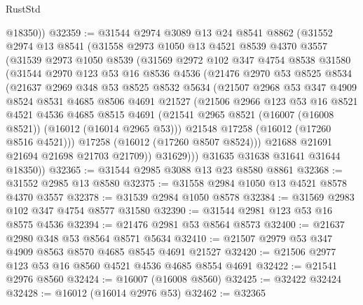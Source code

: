 \begin{lexlean}{RustStd}
\begin{coremodule}
        @18350))
@32359 := @31544
    @2974
    @3089
    @13
    @24
    @8541
    @8862
    (@31552
      @2974
      @13
      @8541
      (@31558
        @2973
        @1050
        @13
        @4521
        @8539
        @4370
        @3557
        (@31539
          @2973
          @1050
          @8539
          (@31569
            @2972
            @102
            @347
            @4754
            @8538
            @31580
            (@31544
              @2970
              @123
              @53
              @16
              @8536
              @4536
              (@21476
                @2970
                @53
                @8525
                @8534
                (@21637
                  @2969
                  @348
                  @53
                  @8525
                  @8532
                  @5634
                  (@21507
                    @2968
                    @53
                    @347
                    @4909
                    @8524
                    @8531
                    @4685
                    @8506
                    @4691
                    @21527
                    (@21506
                      @2966
                      @123
                      @53
                      @16
                      @8521
                      @4521
                      @4536
                      @4685
                      @8515
                      @4691
                      (@21541 @2965 @8521 (@16007 (@16008 @8521)) (@16012 (@16014 @2965 @53)))
                      @21548
                      @17258
                      (@16012 (@17260 @8516 @4521)))
                    @17258
                    (@16012 (@17260 @8507 @8524)))
                  @21688
                  @21691
                  @21694
                  @21698
                  @21703
                  @21709))
              @31629)))
        @31635
        @31638
        @31641
        @31644
        @18350))
@32365 := @31544 @2985 @3088 @13 @23 @8580 @8861
@32368 := @31552 @2985 @13 @8580
@32375 := @31558 @2984 @1050 @13 @4521 @8578 @4370 @3557
@32378 := @31539 @2984 @1050 @8578
@32384 := @31569 @2983 @102 @347 @4754 @8577 @31580
@32390 := @31544 @2981 @123 @53 @16 @8575 @4536
@32394 := @21476 @2981 @53 @8564 @8573
@32400 := @21637 @2980 @348 @53 @8564 @8571 @5634
@32410 := @21507 @2979 @53 @347 @4909 @8563 @8570 @4685 @8545 @4691 @21527
@32420 := @21506 @2977 @123 @53 @16 @8560 @4521 @4536 @4685 @8554 @4691
@32422 := @21541 @2976 @8560
@32424 := @16007 (@16008 @8560)
@32425 := @32422 @32424
@32428 := @16012 (@16014 @2976 @53)
@32462 := @32365

\end{coremodule}
\end{lexlean}
